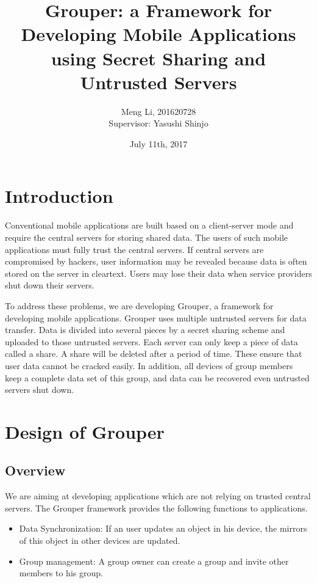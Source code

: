 \documentclass[twocolumn,10pt]{article}
\begin{document}
\date{July 11th, 2017}

\title{\bf Grouper: a Framework for Developing Mobile Applications using Secret Sharing and Untrusted Servers}

\author{
	Meng Li, 201620728  
	\\ Supervisor: Yasushi Shinjo
}

\maketitle

\section{Introduction}

Conventional mobile applications are built based on a client-server mode and require the central servers for storing shared data. 
The users of such mobile applications must fully trust the central servers. 
If central servers are compromised by hackers, user information may be revealed because data is often stored on the server in cleartext. 
Users may lose their data when service providers shut down their servers. 

To address these problems, we are developing Grouper, a framework for developing mobile applications. 
Grouper uses multiple untrusted servers for data transfer.
Data is divided into several pieces by a secret sharing scheme and uploaded to those untrusted servers. 
Each server can only keep a piece of data called a share. A share will be deleted after a period of time. 
These ensure that user data cannot be cracked easily. 
In addition, all devices of group members keep a complete data set of this group, and data can be recovered even untrusted servers shut down.

\section{Design of Grouper}

\subsection{Overview}

We are aiming at developing applications which are not relying on trusted central servers. 
The Grouper framework provides the following functions to applications.

\begin{itemize}
	\setlength{\itemsep}{1pt}
	\setlength{\parskip}{0pt}
	\setlength{\parsep}{0pt}
	\item Data Synchronization: If an user updates an object in his device, the mirrors of this object in other devices are updated.
	\item Group management: A group owner can create a group and invite other members to his group.
\end{itemize}
\end{document}
